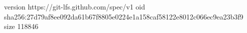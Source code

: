 version https://git-lfs.github.com/spec/v1
oid sha256:27d79af8ee092da61b67f8805e0224e1a158caf58122e8012c066ec9ea23b3f9
size 118846
